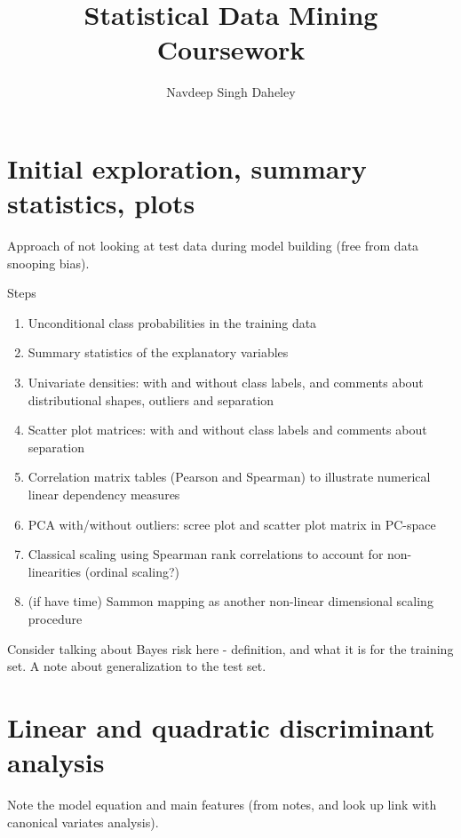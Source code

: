 \documentclass[a4paper,11pt]{article}
\author{Navdeep Singh Daheley}
\title{Statistical Data Mining\\Coursework}
\begin{document}
\maketitle
\tableofcontents

\newpage
\section{Initial exploration, summary statistics, plots}

Approach of not looking at test data during model building (free from
data snooping bias).

Steps
\begin{enumerate}
  \item Unconditional class probabilities in the training data
  \item Summary statistics of the explanatory variables
  \item Univariate densities: with and without class labels, and
    comments about distributional shapes, outliers and separation
  \item Scatter plot matrices: with and without class labels and
    comments about separation
  \item Correlation matrix tables (Pearson and Spearman) to illustrate
    numerical linear dependency measures
  \item PCA with/without outliers: scree plot and scatter plot matrix in PC-space
  \item Classical scaling using Spearman rank correlations to account
    for non-linearities (ordinal scaling?)
  \item (if have time) Sammon mapping as another non-linear dimensional scaling procedure
\end{enumerate}

Consider talking about Bayes risk here - definition, and what it is
for the training set. A note about generalization to the test set.

\newpage
\section{Linear and quadratic discriminant analysis}

Note the model equation and main features (from notes, and look up
link with canonical variates analysis).\\
\end{document}
